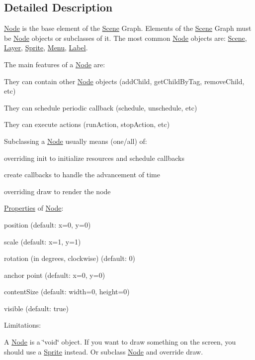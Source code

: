 \subsection{Detailed Description}
\hyperlink{classNode}{Node} is the base element of the \hyperlink{classScene}{Scene} Graph. Elements of the \hyperlink{classScene}{Scene} Graph must be \hyperlink{classNode}{Node} objects or subclasses of it. The most common \hyperlink{classNode}{Node} objects are\+: \hyperlink{classScene}{Scene}, \hyperlink{classLayer}{Layer}, \hyperlink{classSprite}{Sprite}, \hyperlink{classMenu}{Menu}, \hyperlink{classLabel}{Label}. 

The main features of a \hyperlink{classNode}{Node} are\+:
\begin{DoxyItemize}
\item They can contain other \hyperlink{classNode}{Node} objects ({\ttfamily add\+Child}, {\ttfamily get\+Child\+By\+Tag}, {\ttfamily remove\+Child}, etc)
\item They can schedule periodic callback ({\ttfamily schedule}, {\ttfamily unschedule}, etc)
\item They can execute actions ({\ttfamily run\+Action}, {\ttfamily stop\+Action}, etc)
\end{DoxyItemize}

Subclassing a \hyperlink{classNode}{Node} usually means (one/all) of\+:
\begin{DoxyItemize}
\item overriding init to initialize resources and schedule callbacks
\item create callbacks to handle the advancement of time
\item overriding {\ttfamily draw} to render the node
\end{DoxyItemize}

\hyperlink{classProperties}{Properties} of \hyperlink{classNode}{Node}\+:
\begin{DoxyItemize}
\item position (default\+: x=0, y=0)
\item scale (default\+: x=1, y=1)
\item rotation (in degrees, clockwise) (default\+: 0)
\item anchor point (default\+: x=0, y=0)
\item content\+Size (default\+: width=0, height=0)
\item visible (default\+: true)
\end{DoxyItemize}

Limitations\+:
\begin{DoxyItemize}
\item A \hyperlink{classNode}{Node} is a \char`\"{}void\char`\"{} object. If you want to draw something on the screen, you should use a \hyperlink{classSprite}{Sprite} instead. Or subclass \hyperlink{classNode}{Node} and override {\ttfamily draw}. 
\end{DoxyItemize}

